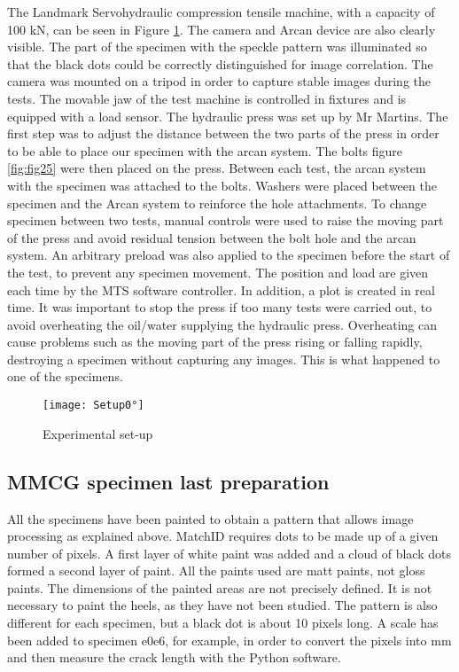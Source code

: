 The Landmark Servohydraulic compression tensile machine, with a capacity of 100 kN, can be seen in Figure \ref{fig:Setup0°}. The camera and Arcan device are also clearly visible. The part of the specimen with the speckle pattern was illuminated so that the black dots could be correctly distinguished for image correlation. The camera was mounted on a tripod in order to capture stable images during the tests. The movable jaw of the test machine is controlled in fixtures and is equipped with a load sensor.
The hydraulic press was set up by Mr Martins. The first step was to adjust the distance between the two parts of the press in order to be able to place our specimen with the arcan system. The bolts figure \ref{fig:fig25}  were then placed on the press. Between each test, the arcan system with the specimen was attached to the bolts. Washers were placed between the specimen and the Arcan system to reinforce the hole attachments. To change specimen between two tests, manual controls were used to raise the moving part of the press and avoid residual tension between the bolt hole and the arcan system. An arbitrary preload was also applied to the specimen before the start of the test, to prevent any specimen movement. The position and load are given each time by the MTS software controller. In addition, a plot is created in real time. It was important to stop the press if too many tests were carried out, to avoid overheating the oil/water supplying the hydraulic press. Overheating can cause problems such as the moving part of the press rising or falling rapidly, destroying a specimen without capturing any images. This is what happened to one of the specimens.

\begin{figure}[htp]
	\centering
	\texttt{[image: Setup0°]}
	\caption{Experimental set-up}
	\label{fig:Setup0°}
\end{figure}

\subsection{MMCG specimen last preparation}

All the specimens have been painted to obtain a pattern that allows image processing as explained above. MatchID requires dots to be made up of a given number of pixels. A first layer of white paint was added and a cloud of black dots formed a second layer of paint. All the paints used are matt paints, not gloss paints. The dimensions of the painted areas are not precisely defined. It is not necessary to paint the heels, as they have not been studied. The pattern is also different for each specimen, but a black dot is about 10 pixels long. A scale has been added to specimen e0e6, for example, in order to convert the pixels into mm and then measure the crack length with the Python software. 

